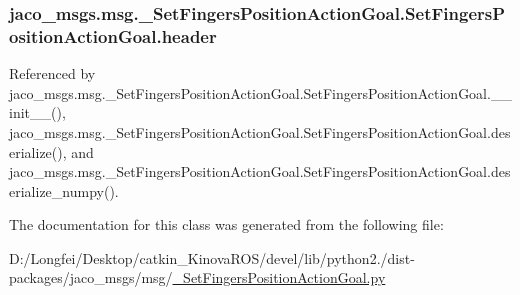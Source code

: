 \subsubsection[{\texorpdfstring{header}{header}}]{\setlength{\rightskip}{0pt plus 5cm}jaco\+\_\+msgs.\+msg.\+\_\+\+Set\+Fingers\+Position\+Action\+Goal.\+Set\+Fingers\+Position\+Action\+Goal.\+header}\hypertarget{classjaco__msgs_1_1msg_1_1__SetFingersPositionActionGoal_1_1SetFingersPositionActionGoal_aaab21a95f77c604078e24ad69f6c28c6}{}\label{classjaco__msgs_1_1msg_1_1__SetFingersPositionActionGoal_1_1SetFingersPositionActionGoal_aaab21a95f77c604078e24ad69f6c28c6}


Referenced by jaco\+\_\+msgs.\+msg.\+\_\+\+Set\+Fingers\+Position\+Action\+Goal.\+Set\+Fingers\+Position\+Action\+Goal.\+\_\+\+\_\+init\+\_\+\+\_\+(), jaco\+\_\+msgs.\+msg.\+\_\+\+Set\+Fingers\+Position\+Action\+Goal.\+Set\+Fingers\+Position\+Action\+Goal.\+deserialize(), and jaco\+\_\+msgs.\+msg.\+\_\+\+Set\+Fingers\+Position\+Action\+Goal.\+Set\+Fingers\+Position\+Action\+Goal.\+deserialize\+\_\+numpy().



The documentation for this class was generated from the following file\+:\begin{DoxyCompactItemize}
\item 
D\+:/\+Longfei/\+Desktop/catkin\+\_\+\+Kinova\+R\+O\+S/devel/lib/python2./dist-\/packages/jaco\+\_\+msgs/msg/\hyperlink{__SetFingersPositionActionGoal_8py}{\+\_\+\+Set\+Fingers\+Position\+Action\+Goal.\+py}\end{DoxyCompactItemize}
